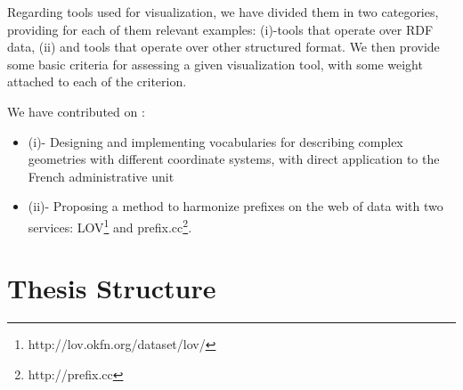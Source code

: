 Regarding tools used for visualization, we have divided them in two categories, providing for each of them relevant examples: (i)-tools that operate over RDF data, (ii) and tools that operate over other structured format. We then provide some basic criteria for assessing a given visualization tool, with some weight attached to each of the criterion. 

We have contributed  on : 
\begin{itemize}
\item (i)- Designing and implementing vocabularies for describing complex geometries with different coordinate systems, with direct application to the French administrative unit
\item (ii)- Proposing a method to harmonize prefixes on the web of data  with two services: LOV\footnote{http://lov.okfn.org/dataset/lov/} and prefix.cc\footnote{http://prefix.cc}. 
\end{itemize}

\section{Thesis Structure}
\label{sec:thesis-structure}